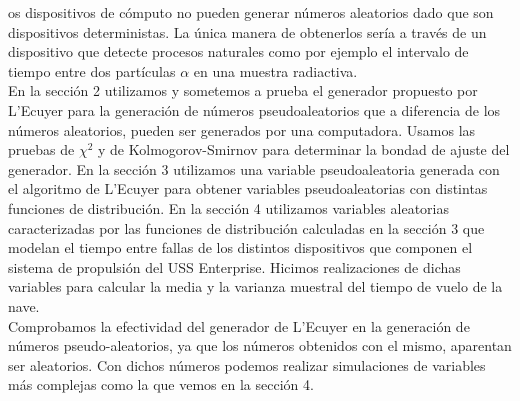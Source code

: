 \documentclass[10pt,journal,compsoc]{IEEEtran}
\begin{document}
os dispositivos de c\'omputo no pueden generar n\'umeros aleatorios dado que 
son dispositivos deterministas. La \'unica manera de obtenerlos ser\'ia a trav\'es de un dispositivo
que detecte procesos naturales como por ejemplo el intervalo de tiempo entre dos part\'iculas $\alpha$
en una muestra radiactiva.\\
\indent En la secci\'on 2 utilizamos y sometemos a prueba el generador propuesto por L'Ecuyer para la
generaci\'on de n\'umeros pseudoaleatorios que a diferencia de los n\'umeros aleatorios, pueden 
ser generados por una computadora. Usamos las pruebas de $\chi^2$ y de Kolmogorov-Smirnov para determinar la bondad de ajuste del
generador. En la secci\'on 3 utilizamos una variable pseudoaleatoria generada con el algoritmo de L'Ecuyer para
obtener variables pseudoaleatorias con distintas funciones de distribuci\'on. En la secci\'on 4 utilizamos variables
aleatorias caracterizadas por las funciones de distribuci\'on calculadas en la secci\'on 3 que modelan el tiempo
entre fallas de los distintos dispositivos que componen el sistema de propulsi\'on del USS Enterprise. Hicimos 
realizaciones de dichas variables para calcular la media y la varianza muestral del tiempo de vuelo de la nave.\\
Comprobamos la efectividad del generador de L'Ecuyer en la generaci\'on de n\'umeros pseudo-aleatorios,
ya que los n\'umeros obtenidos con el mismo, aparentan ser aleatorios. Con dichos n\'umeros podemos realizar
simulaciones de variables m\'as complejas como la que vemos en la secci\'on 4.  \\
\end{document}
